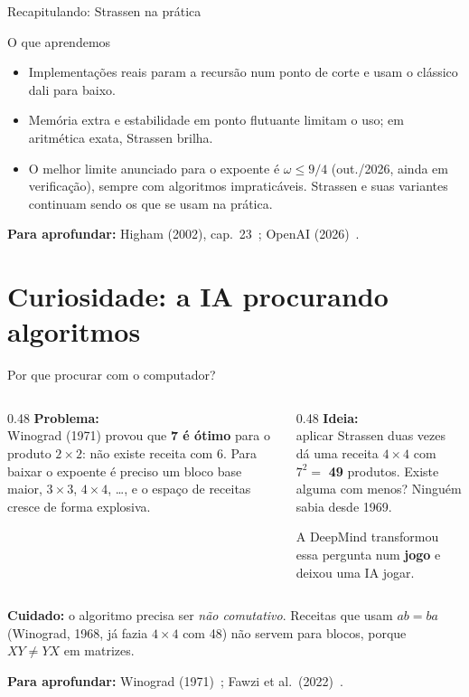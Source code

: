 \documentclass[aspectratio=169,xcolor=table]{beamer}
\newcommand{\fonte}[1]{%
  \vfill
  {\tiny\color{gray!55!black}\textbf{Para aprofundar:} #1\par}%
}
\begin{document}
\begin{frame}{Recapitulando: Strassen na prática}
  \begin{block}{O que aprendemos}
    \begin{itemize}\scriptsize
      \item Implementações reais param a recursão num ponto de corte e usam o clássico
            dali para baixo.
      \item Memória extra e estabilidade em ponto flutuante limitam o uso; em aritmética
            exata, Strassen brilha.
      \item O melhor limite anunciado para o expoente é $\omega\le 9/4$ (out./2026, ainda
            em verificação), sempre com algoritmos impraticáveis. Strassen e suas variantes continuam sendo os que se
            usam na prática.
    \end{itemize}
  \end{block}
  \fonte{Higham (2002), cap.~23~\cite{higham2002accuracy};
    OpenAI (2026)~\cite{openai2026ninefourths}.}
\end{frame}

\section{Curiosidade: a IA procurando algoritmos}

\begin{frame}{Por que procurar com o computador?}
  \begin{columns}[T]
    \begin{column}{0.48\textwidth}
      \textbf{Problema:}\\
      \scriptsize Winograd (1971) provou que \textbf{7 é ótimo} para o produto $2\times 2$:
      não existe receita com 6. Para baixar o expoente é preciso um bloco base maior,
      $3\times3$, $4\times4$, \ldots, e o espaço de receitas cresce de forma explosiva.
    \end{column}
    \begin{column}{0.48\textwidth}
      \textbf{Ideia:}\\
      \scriptsize aplicar Strassen duas vezes dá uma receita $4\times 4$ com $7^2=$ \textbf{49}
      produtos. Existe alguma com menos? Ninguém sabia desde 1969.
      \medskip

      A DeepMind transformou essa pergunta num \textbf{jogo} e deixou uma IA jogar.
    \end{column}
  \end{columns}
  \medskip
  {\scriptsize\textbf{Cuidado:} o algoritmo precisa ser \emph{não comutativo}. Receitas que
  usam $ab=ba$ (Winograd, 1968, já fazia $4\times4$ com 48) não servem para blocos,
  porque $XY\neq YX$ em matrizes.}
  \fonte{Winograd (1971)~\cite{winograd1971multiplication};
    Fawzi et al.\ (2022)~\cite{fawzi2022discovering}.}
\end{frame}
\end{document}
